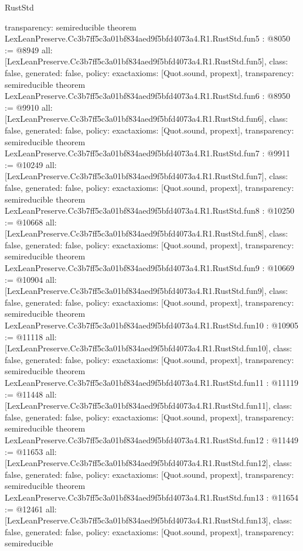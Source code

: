 \begin{lexlean}{RustStd}
\begin{coremodule}
{  transparency: semireducible
}
theorem LexLeanPreserve.Cc3b7ff5c3a01bf834aed9f5bfd4073a4.R1.RustStd.fun5 : @8050 := @8949 {
  all: [LexLeanPreserve.Cc3b7ff5c3a01bf834aed9f5bfd4073a4.R1.RustStd.fun5],
  class: false,
  generated: false,
  policy: exact{axioms: [Quot.sound, propext]},
  transparency: semireducible
}
theorem LexLeanPreserve.Cc3b7ff5c3a01bf834aed9f5bfd4073a4.R1.RustStd.fun6 : @8950 := @9910 {
  all: [LexLeanPreserve.Cc3b7ff5c3a01bf834aed9f5bfd4073a4.R1.RustStd.fun6],
  class: false,
  generated: false,
  policy: exact{axioms: [Quot.sound, propext]},
  transparency: semireducible
}
theorem LexLeanPreserve.Cc3b7ff5c3a01bf834aed9f5bfd4073a4.R1.RustStd.fun7 : @9911 := @10249 {
  all: [LexLeanPreserve.Cc3b7ff5c3a01bf834aed9f5bfd4073a4.R1.RustStd.fun7],
  class: false,
  generated: false,
  policy: exact{axioms: [Quot.sound, propext]},
  transparency: semireducible
}
theorem LexLeanPreserve.Cc3b7ff5c3a01bf834aed9f5bfd4073a4.R1.RustStd.fun8 : @10250 := @10668 {
  all: [LexLeanPreserve.Cc3b7ff5c3a01bf834aed9f5bfd4073a4.R1.RustStd.fun8],
  class: false,
  generated: false,
  policy: exact{axioms: [Quot.sound, propext]},
  transparency: semireducible
}
theorem LexLeanPreserve.Cc3b7ff5c3a01bf834aed9f5bfd4073a4.R1.RustStd.fun9 : @10669 := @10904 {
  all: [LexLeanPreserve.Cc3b7ff5c3a01bf834aed9f5bfd4073a4.R1.RustStd.fun9],
  class: false,
  generated: false,
  policy: exact{axioms: [Quot.sound, propext]},
  transparency: semireducible
}
theorem LexLeanPreserve.Cc3b7ff5c3a01bf834aed9f5bfd4073a4.R1.RustStd.fun10 : @10905 := @11118 {
  all: [LexLeanPreserve.Cc3b7ff5c3a01bf834aed9f5bfd4073a4.R1.RustStd.fun10],
  class: false,
  generated: false,
  policy: exact{axioms: [Quot.sound, propext]},
  transparency: semireducible
}
theorem LexLeanPreserve.Cc3b7ff5c3a01bf834aed9f5bfd4073a4.R1.RustStd.fun11 : @11119 := @11448 {
  all: [LexLeanPreserve.Cc3b7ff5c3a01bf834aed9f5bfd4073a4.R1.RustStd.fun11],
  class: false,
  generated: false,
  policy: exact{axioms: [Quot.sound, propext]},
  transparency: semireducible
}
theorem LexLeanPreserve.Cc3b7ff5c3a01bf834aed9f5bfd4073a4.R1.RustStd.fun12 : @11449 := @11653 {
  all: [LexLeanPreserve.Cc3b7ff5c3a01bf834aed9f5bfd4073a4.R1.RustStd.fun12],
  class: false,
  generated: false,
  policy: exact{axioms: [Quot.sound, propext]},
  transparency: semireducible
}
theorem LexLeanPreserve.Cc3b7ff5c3a01bf834aed9f5bfd4073a4.R1.RustStd.fun13 : @11654 := @12461 {
  all: [LexLeanPreserve.Cc3b7ff5c3a01bf834aed9f5bfd4073a4.R1.RustStd.fun13],
  class: false,
  generated: false,
  policy: exact{axioms: [Quot.sound, propext]},
  transparency: semireducible
}
\end{coremodule}
\end{lexlean}

